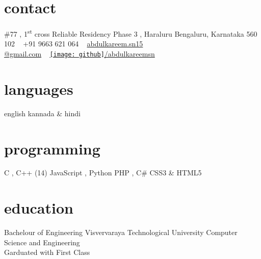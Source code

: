 \documentclass[]{friggeri-cv} %
\begin{document}


\begin{aside} %
\section{contact}
\#77 , 1\textsuperscript{st}  cross
Reliable Residency Phase 3 , Haraluru
Bengaluru, Karnataka 560 102
~
+91 9663 621 064
~
\href{mailto:abdulkareem.sn15@gmail.com}{abdulkareem.sn15\\@gmail.com}
~
\href{https://github.com/abdulkareemsn}{\texttt{[image: github]}/abdulkareemsn}
\section{languages}
english 
kannada \& hindi
\section{programming}
C , C++ (14)
JavaScript , Python
PHP , C\#
CSS3 \& HTML5
\end{aside}


\section{education}

\begin{entrylist}


{Bachelour {\normalfont of Engineering}}
{Visvervaraya Technological University}
{Computer Science and Engineering\\Garduated with First Class}






\end{entrylist}
\end{document}
